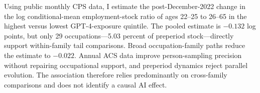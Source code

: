 Using public monthly CPS data, I estimate the post-December-2022 change in the log conditional-mean employment-stock ratio of ages 22--25 to 26--65 in the highest versus lowest GPT-4-exposure quintile. The pooled estimate is $-0.132$ log points, but only 29 occupations---5.03 percent of preperiod stock---directly support within-family tail comparisons. Broad occupation-family paths reduce the estimate to $-0.022$. Annual ACS data improve person-sampling precision without repairing occupational support, and preperiod dynamics reject parallel evolution. The association therefore relies predominantly on cross-family comparisons and does not identify a causal AI effect.
